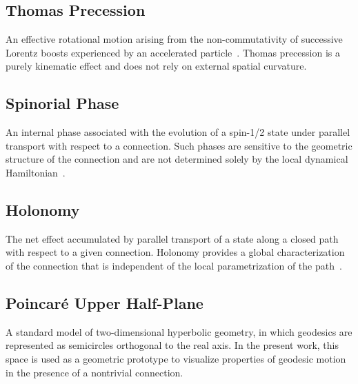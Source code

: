 \documentclass[%
 reprint,
 amsmath,amssymb,
 aps,
 prb,
]{revtex4-2}
\numberwithin{equation}{section}
\begin{document}
\subsection*{Thomas Precession}
An effective rotational motion arising from the non-commutativity of successive Lorentz boosts experienced by an accelerated particle~\cite{thomas1926,Jackson1999}. Thomas precession is a purely kinematic effect and does not rely on external spatial curvature.

\subsection*{Spinorial Phase}
An internal phase associated with the evolution of a spin-1/2 state under parallel transport with respect to a connection. Such phases are sensitive to the geometric structure of the connection and are not determined solely by the local dynamical Hamiltonian~\cite{wigner1939,sakurai2017}.

\subsection*{Holonomy}
The net effect accumulated by parallel transport of a state along a closed path with respect to a given connection. Holonomy provides a global characterization of the connection that is independent of the local parametrization of the path~\cite{nakahara2003}.

\subsection*{Poincar\'e Upper Half-Plane}
A standard model of two-dimensional hyperbolic geometry, in which geodesics are represented as semicircles orthogonal to the real axis. In the present work, this space is used as a geometric prototype to visualize properties of geodesic motion in the presence of a nontrivial connection.

\end{document}
